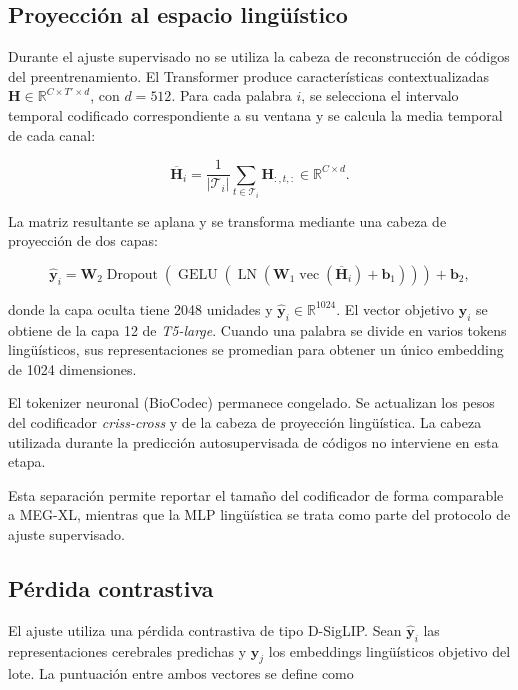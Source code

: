 \subsection{Proyección al espacio lingüístico}

Durante el ajuste supervisado no se utiliza la cabeza de reconstrucción de códigos del preentrenamiento. El Transformer produce características contextualizadas
\(\mathbf{H}\in\mathbb{R}^{C\times T'\times d}\), con \(d=512\). Para cada palabra \(i\), se selecciona el intervalo temporal codificado correspondiente a su ventana y se calcula la media temporal de cada canal:

\begin{equation}
\overline{\mathbf{H}}_i =
\frac{1}{|\mathcal{T}_i|}
\sum_{t\in\mathcal{T}_i}
\mathbf{H}_{:,t,:}
\in\mathbb{R}^{C\times d}.
\end{equation}

La matriz resultante se aplana y se transforma mediante una cabeza de proyección de dos capas:

\begin{equation}
\widehat{\mathbf{y}}_i =
\mathbf{W}_2
\operatorname{Dropout}
\left(
\operatorname{GELU}
\left(
\operatorname{LN}
\left(
\mathbf{W}_1
\operatorname{vec}
(\overline{\mathbf{H}}_i)
+\mathbf{b}_1
\right)
\right)
\right)
+\mathbf{b}_2,
\end{equation}

\noindent donde la capa oculta tiene 2048 unidades y
\(\widehat{\mathbf{y}}_i\in\mathbb{R}^{1024}\).
El vector objetivo \(\mathbf{y}_i\) se obtiene de la capa 12 de
\textit{T5-large}. Cuando una palabra se divide en varios tokens lingüísticos, sus representaciones se promedian para obtener un único embedding de 1024 dimensiones.

El tokenizer neuronal (BioCodec) permanece congelado. Se actualizan los pesos del codificador \textit{criss-cross} y de la cabeza de proyección lingüística. La cabeza utilizada durante la predicción autosupervisada de códigos no interviene en esta etapa.

Esta separación permite reportar el tamaño del codificador de forma comparable a MEG-XL, mientras que la MLP lingüística se trata como parte del protocolo de ajuste supervisado.

\subsection{Pérdida contrastiva}

El ajuste utiliza una pérdida contrastiva de tipo D-SigLIP. Sean
\(\widehat{\mathbf{y}}_i\) las representaciones cerebrales predichas y
\(\mathbf{y}_j\) los embeddings lingüísticos objetivo del lote. La puntuación entre ambos vectores se define como

